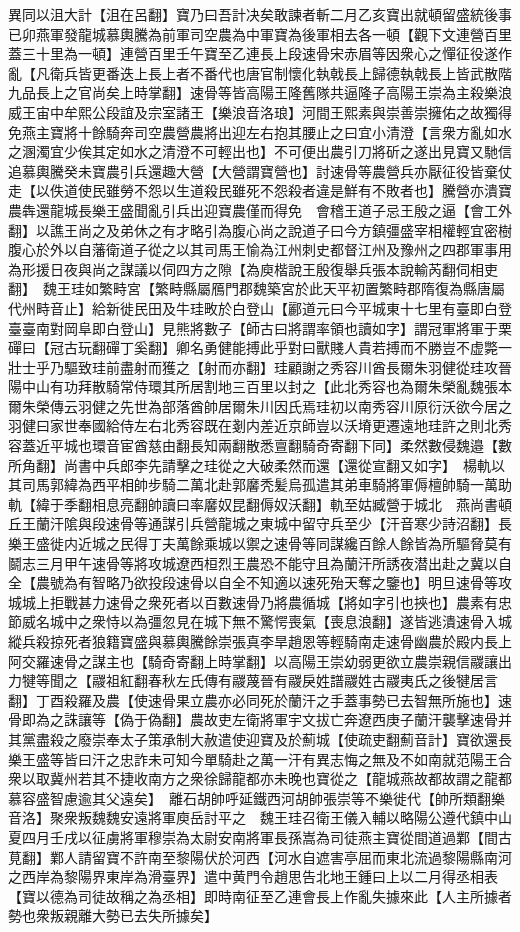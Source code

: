 異同以沮大計【沮在呂翻】寶乃曰吾計决矣敢諫者斬二月乙亥寶出就頓留盛統後事已卯燕軍發龍城慕輿騰為前軍司空農為中軍寶為後軍相去各一頓【觀下文連營百里蓋三十里為一頓】連營百里壬午寶至乙連長上段速骨宋赤眉等因衆心之憚征役遂作亂【凡衛兵皆更番迭上長上者不番代也唐官制懷化執戟長上歸德執戟長上皆武散階九品長上之官尚矣上時掌翻】速骨等皆高陽王隆舊隊共逼隆子高陽王崇為主殺樂浪威王宙中牟熙公段誼及宗室諸王【樂浪音洛琅】河間王熙素與崇善崇擁佑之故獨得免燕主寶將十餘騎奔司空農營農將出迎左右抱其腰止之曰宜小清澄【言衆方亂如水之溷濁宜少俟其定如水之清澄不可輕出也】不可便出農引刀將斫之遂出見寶又馳信追慕輿騰癸未寶農引兵還趣大營【大營謂寶營也】討速骨等農營兵亦厭征役皆棄仗走【以佚道使民雖勞不怨以生道殺民雖死不怨殺者違是鮮有不敗者也】騰營亦潰寶農犇還龍城長樂王盛聞亂引兵出迎寶農僅而得免　會稽王道子忌王殷之逼【會工外翻】以譙王尚之及弟休之有才略引為腹心尚之說道子曰今方鎮彊盛宰相權輕宜密樹腹心於外以自藩衛道子從之以其司馬王愉為江州刺史都督江州及豫州之四郡軍事用為形援日夜與尚之謀議以伺四方之隙【為庾楷說王殷復舉兵張本說輸芮翻伺相吏翻】　魏王珪如繁畤宮【繁畤縣屬鴈門郡魏築宮於此天平初置繁畤郡隋復為縣唐屬代州畤音止】給新徙民田及牛珪畋於白登山【酈道元曰今平城東十七里有臺即白登臺臺南對岡阜即白登山】見熊將數子【師古曰將謂率領也讀如字】謂冠軍將軍于栗磾曰【冠古玩翻磾丁奚翻】卿名勇健能搏此乎對曰獸賤人貴若搏而不勝豈不虚斃一壯士乎乃驅致珪前盡射而獲之【射而亦翻】珪顧謝之秀容川酋長爾朱羽健從珪攻晉陽中山有功拜散騎常侍環其所居割地三百里以封之【此北秀容也為爾朱榮亂魏張本爾朱榮傳云羽健之先世為部落酋帥居爾朱川因氏焉珪初以南秀容川原衍沃欲今居之羽健曰家世奉國給侍左右北秀容既在剗内差近京師豈以沃塉更遷遠地珪許之則北秀容蓋近平城也環音宦酋慈由翻長知兩翻散悉亶翻騎奇寄翻下同】柔然數侵魏邉【數所角翻】尚書中兵郎李先請擊之珪從之大破柔然而還【還從宣翻又如字】　楊軌以其司馬郭緯為西平相帥步騎二萬北赴郭黁秃髪烏孤遣其弟車騎將軍傉檀帥騎一萬助軌【緯于季翻相息亮翻帥讀曰率黁奴昆翻傉奴沃翻】軌至姑臧營于城北　燕尚書頓丘王蘭汗隂與段速骨等通謀引兵營龍城之東城中留守兵至少【汗音寒少詩沼翻】長樂王盛徙内近城之民得丁夫萬餘乘城以禦之速骨等同謀纔百餘人餘皆為所驅脅莫有鬬志三月甲午速骨等將攻城遼西桓烈王農恐不能守且為蘭汗所誘夜潜出赴之冀以自全【農號為有智略乃欲投段速骨以自全不知適以速死殆天奪之鑒也】明旦速骨等攻城城上拒戰甚力速骨之衆死者以百數速骨乃將農循城【將如字引也挾也】農素有忠節威名城中之衆恃以為彊忽見在城下無不驚愕喪氣【喪息浪翻】遂皆逃潰速骨入城縱兵殺掠死者狼籍寶盛與慕輿騰餘崇張真李旱趙恩等輕騎南走速骨幽農於殿内長上阿交羅速骨之謀主也【騎奇寄翻上時掌翻】以高陽王崇幼弱更欲立農崇親信鬷讓出力犍等聞之【鬷祖紅翻春秋左氏傳有鬷蔑晉有鬷戾姓譜鬷姓古鬷夷氏之後犍居言翻】丁酉殺羅及農【使速骨果立農亦必同死於蘭汗之手蓋事勢已去智無所施也】速骨即為之誅讓等【偽于偽翻】農故吏左衛將軍宇文拔亡奔遼西庚子蘭汗襲擊速骨并其黨盡殺之廢崇奉太子策承制大赦遣使迎寶及於薊城【使疏吏翻薊音計】寶欲還長樂王盛等皆曰汗之忠詐未可知今單騎赴之萬一汗有異志悔之無及不如南就范陽王合衆以取冀州若其不捷收南方之衆徐歸龍都亦未晚也寶從之【龍城燕故都故謂之龍都慕容盛智慮逾其父遠矣】　離石胡帥呼延鐵西河胡帥張崇等不樂徙代【帥所類翻樂音洛】聚衆叛魏魏安遠將軍庾岳討平之　魏王珪召衛王儀入輔以略陽公遵代鎮中山夏四月壬戌以征虜將軍穆崇為太尉安南將軍長孫嵩為司徒燕主寶從間道過鄴【間古莧翻】鄴人請留寶不許南至黎陽伏於河西【河水自遮害亭屈而東北流過黎陽縣南河之西岸為黎陽界東岸為滑臺界】遣中黄門令趙思告北地王鍾曰上以二月得丞相表【寶以德為司徒故稱之為丞相】即時南征至乙連會長上作亂失據來此【人主所據者勢也衆叛親離大勢已去失所據矣】
